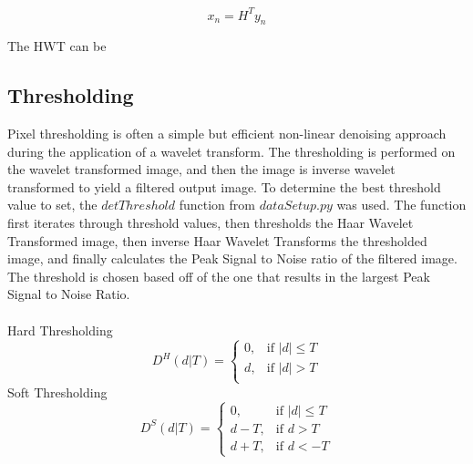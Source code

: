 \documentclass{article}
\begin{document}
 \begin{equation}\label{eqn:Inverse_HWT}
 x_{n} = H^Ty_{n}
 \end{equation}
 
 The HWT can be 
\subsection{Thresholding}
Pixel thresholding is often a simple but efficient non-linear denoising approach during the application of a wavelet transform. The thresholding is performed on the wavelet transformed image, and then the image is inverse wavelet transformed to yield a filtered output image. To determine the best threshold value to set, the $detThreshold$ function from $dataSetup.py$ was used. The function first iterates through threshold values, then thresholds the Haar Wavelet Transformed image, then inverse Haar Wavelet Transforms the thresholded image, and finally calculates the Peak Signal to Noise ratio of the filtered image. The threshold is chosen based off of the one that results in the largest Peak Signal to Noise Ratio. \\\\
Hard Thresholding   
\begin{equation}\label{eqn:Hard Threshold}
D^H(d|T) =
\begin{cases}
0, & \text{if $|d| \leq T$} \\
d, & \text{if $|d| > T$} \\
\end{cases}
\end{equation}	
Soft Thresholding
\begin{equation}\label{eqn:Soft Threshold}
D^S(d|T) =
\begin{cases}
0, & \text{if $|d| \leq T$} \\
d-T, & \text{if $d > T$} \\
d+T, & \text{if $d < -T$}
\end{cases}
\end{equation} 
\end{document}
